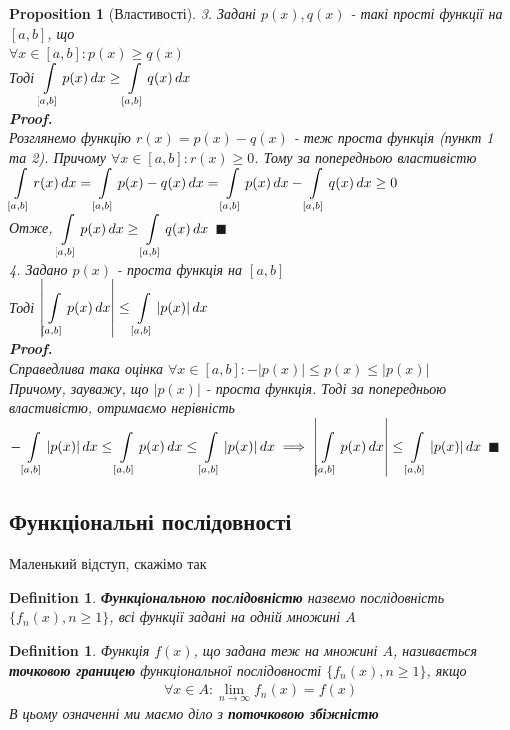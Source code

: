 \documentclass[a4paper, 14pt]{extarticle}
\def\huge{\displaystyle}
\def\bigline{\vspace{5mm}\\}
\theoremstyle{theoremdd}
\theoremstyle{theoremdd}
\newtheorem{definition}[theorem]{Definition}
\theoremstyle{theoremdd}
\theoremstyle{theoremdd}
\theoremstyle{theoremdd}
\newtheorem{proposition}[theorem]{Proposition}
\theoremstyle{theoremdd}
\theoremstyle{theoremdd}
\theoremstyle{theoremdd}
\newenvironment{pfNoTh}{\textbf{Proof. \\}}{$\blacksquare$}
\begin{document}
\begin{proposition}[Властивості]
3. Задані $p(x),q(x)$ - такі прості функції на $[a,b]$, що \\ $\forall x \in [a,b]: p(x) \geq q(x)$\\
\bigskip
Тоді $\huge \int\displaylimits_{[a,b]} p(x)\,dx \geq \huge \int\displaylimits_{[a,b]} q(x)\,dx$\\
\begin{pfNoTh}
Розглянемо функцію $r(x) = p(x) - q(x)$ - теж проста функція (пункт 1 та 2). Причому $\forall x \in [a,b]: r(x) \geq 0$. Тому за попередньою властивістю\\
$\huge \int\displaylimits_{[a,b]} r(x)\,dx = \int\displaylimits_{[a,b]} p(x) - q(x) \,dx = \int\displaylimits_{[a,b]} p(x) \,dx - \int\displaylimits_{[a,b]} q(x) \,dx  \geq 0$\\
Отже, $\huge \int\displaylimits_{[a,b]} p(x)\,dx \geq \huge \int\displaylimits_{[a,b]} q(x)\,dx$
\end{pfNoTh}
\bigline

4. Задано $p(x)$ - проста функція на $[a,b]$\\
\bigskip
Тоді $\huge \abs{\int\displaylimits_{[a,b]} p(x)\,dx} \leq \int\displaylimits_{[a,b]} |p(x)|\,dx$\\
\begin{pfNoTh}
Справедлива така оцінка $\forall x \in [a,b]: -|p(x)| \leq p(x) \leq |p(x)|$\\
Причому, зауважу, що $|p(x)|$ - проста функція. Тоді за попередньою властивістю, отримаємо нерівність\\
$\huge -\int\displaylimits_{[a,b]} |p(x)|\,dx \leq \int\displaylimits_{[a,b]} p(x)\,dx \leq \int\displaylimits_{[a,b]} |p(x)| \,dx \implies \abs{\int\displaylimits_{[a,b]} p(x)\,dx} \leq \int\displaylimits_{[a,b]} |p(x)|\,dx$
\end{pfNoTh}
\bigline
\end{proposition}


\subsection{Функціональні послідовності}
Маленький відступ, скажімо так
\begin{definition}
\textbf{Функціональною послідовністю} назвемо послідовність $\{f_n(x), n \geq 1 \}$, всі функції задані на одній множині $A$
\end{definition}

\begin{definition}
Функція $f(x)$, що задана теж на множині $A$, називається \textbf{точковою границею} функціональної послідовності $\{f_n(x), n \geq 1\}$, якщо
\begin{align*}
\forall x \in A: \lim_{n \to \infty} f_n(x) = f(x)
\end{align*}
В цьому означенні ми маємо діло з \textbf{поточковою збіжністю}
\end{definition}
\end{document}
